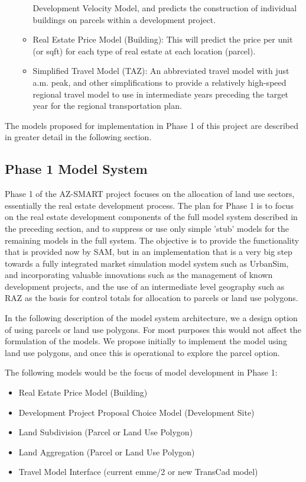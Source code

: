 \begin{itemize}
\begin{itemize}
Development Velocity Model, and predicts the construction of individual
buildings on parcels within a development project.
\item Real Estate Price Model (Building): This will predict the price
per unit (or sqft) for each type of real estate at each location (parcel).
\item Simplified Travel Model (TAZ): An abbreviated travel model with
just a.m. peak, and other simplifications to provide a relatively
high-speed regional travel model to use in intermediate years preceding
the target year for the regional transportation plan.
\end{itemize}
\end{itemize}

The models proposed for implementation in Phase 1 of this project are
described in greater detail in the following section.

\subsection{Phase 1 Model System}
Phase 1 of the AZ-SMART project focuses on the allocation of land use
sectors, essentially the real estate development process.  The plan
for Phase 1 is to focus on the real estate development components of
the full model system described in the preceding section, and to
suppress or use only simple 'stub' models for the remaining models
in the full system.  The objective is to provide the functionality
that is provided now by SAM, but in an implementation that is a
very big step towards a fully integrated market simulation model
system such as UrbanSim, and incorporating valuable innovations
such as the management of known development projects, and the use
of an intermediate level geography such as RAZ as the basis for
control totals for allocation to parcels or land use polygons.  

In the following
description of the model system architecture, we a design
option of using parcels or land use polygons.  For most purposes this would not affect
the formulation of the models.  We propose initially to implement the model using 
land use polygons, and once this is operational to explore the parcel option.

The following models would be the focus of model development in Phase 1:

\begin{itemize}
\item Real Estate Price Model (Building)
\item Development Project Proposal Choice Model (Development Site)
\item Land Subdivision (Parcel or Land Use Polygon)
\item Land Aggregation (Parcel or Land Use Polygon)
\item Travel Model Interface (current emme/2 or new TransCad model)
\end{itemize}

